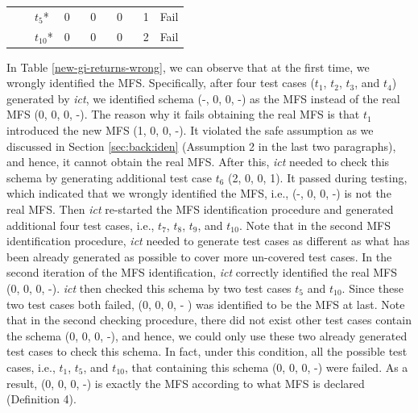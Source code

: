 \documentclass[journal,12pt,onecolumn,draftclsnofoot,]{IEEEtran}
\begin{document}
\begin{table}[ht]
\begin{tabular}{llllll|llllll}
\multicolumn{5}{l}{}                                                                                                                                                           &      & $t_{5}$*     & \multicolumn{4}{l}{0 \ \ \   0 \ \ \   0 \ \ \  1}  & Fail   \\
\multicolumn{5}{l}{}                                                                                                                                                           &      & $t_{10}$*     & \multicolumn{4}{l}{0 \ \ \   0 \ \ \   0 \ \ \  2}  & Fail   \\
\hline
\end{tabular}
\end{table}

In Table \ref{new-gi-returns-wrong}, we can observe that at the first time, we wrongly identified the MFS. Specifically, after four test cases ($t_{1}$, $t_{2}$, $t_{3}$, and $t_{4}$) generated by \emph{ict}, we identified schema (-, 0, 0, -) as the MFS instead of the real MFS (0, 0, 0, -). The reason why it fails obtaining the real MFS is that $t_{1}$ introduced the new MFS (1, 0, 0, -). It violated the safe assumption as we discussed in Section \ref{sec:back:iden} (Assumption 2 in the last two paragraphs), and hence, it cannot obtain the real MFS. After this, \emph{ict} needed to check this schema by generating additional test case $t_{6}$ (2, 0, 0, 1). It passed during testing, which indicated that we wrongly identified the MFS, i.e., (-, 0, 0, -) is not the real MFS. Then \emph{ict} re-started the MFS identification procedure and generated additional four test cases, i.e., $t_{7}$,  $t_{8}$, $t_{9}$, and  $t_{10}$. Note that in the second MFS identification procedure, \emph{ict} needed to generate test cases as different as what has been already generated as possible to cover more un-covered test cases. In the second iteration of the MFS identification, \emph{ict} correctly identified the real MFS (0, 0, 0, -).  \emph{ict} then checked this schema by two test cases $t_{5}$ and $t_{10}$. Since these two test cases both failed, (0, 0, 0, - ) was identified to be the MFS at last. Note that in the second checking procedure, there did not exist other test cases contain the schema (0, 0, 0, -), and hence, we could only use these two already generated test cases to check this schema. In fact, under this condition, all the possible test cases, i.e., $t_{1}$, $t_{5}$, and $t_{10}$, that containing this schema (0, 0, 0, -) were failed. As a result, (0, 0, 0, -) is exactly the MFS according to what MFS is declared (Definition 4).
\end{document}

